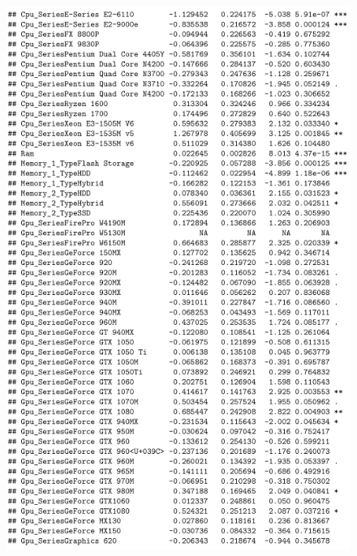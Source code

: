 \documentclass[12pt]{article}
\begin{document}
\begin{figure}[h!]
    \centering
    \includegraphics{Model_1_Sum(3_3).png}
    \label{fig:SUM13}
\end{figure}
\end{document}
